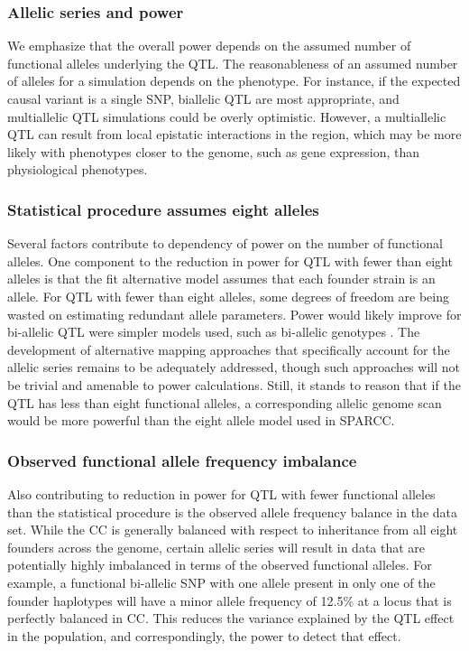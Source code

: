 \subsubsection{Allelic series and power}

We emphasize that the overall power depends on the assumed number of functional alleles underlying the QTL. The reasonableness of an assumed number of alleles for a simulation depends on the phenotype. For instance, if the expected causal variant is a single SNP, biallelic QTL are most appropriate, and multiallelic QTL simulations could be overly optimistic. However, a multiallelic QTL can result from local epistatic interactions in the region, which may be more likely with phenotypes closer to the genome, such as gene expression, than physiological phenotypes. 

\subsubsection{Statistical procedure assumes eight alleles} 

Several factors contribute to dependency of power on the number of functional alleles. One component to the reduction in power for QTL with fewer than eight alleles is that the fit alternative model assumes that each founder strain is an allele. For QTL with fewer than eight alleles, some degrees of freedom are being wasted on estimating redundant allele parameters. Power would likely improve for bi-allelic QTL were simpler models used, such as bi-allelic genotypes \citep{Yalcin2005}. The development of alternative mapping approaches that specifically account for the allelic series remains to be adequately addressed, though such approaches will not be trivial and amenable to power calculations. Still, it stands to reason that if the QTL has less than eight functional alleles, a corresponding allelic genome scan would be more powerful than the eight allele model used in SPARCC.

\subsubsection{Observed functional allele frequency imbalance}

Also contributing to reduction in power for QTL with fewer functional alleles than the statistical procedure is the observed allele frequency balance in the data set. While the CC is generally balanced with respect to inheritance from all eight founders across the genome, certain allelic series will result in data that are potentially highly imbalanced in terms of the observed functional alleles. For example, a functional bi-allelic SNP with one allele present in only one of the founder haplotypes will have a minor allele frequency of 12.5\% at a locus that is perfectly balanced in CC. This reduces the variance explained by the QTL effect in the population, and correspondingly, the power to detect that effect.

